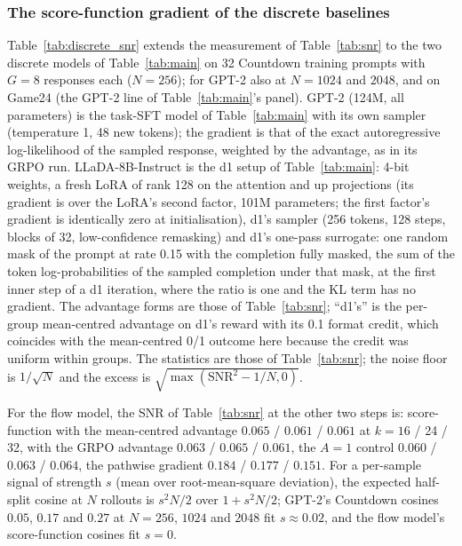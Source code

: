 \fi


\iffalse
\subsubsection{The score-function gradient of the discrete baselines}
\label{app:discrete_snr}
Table~\ref{tab:discrete_snr} extends the measurement of Table~\ref{tab:snr} to the two discrete models of Table~\ref{tab:main} on 32 Countdown training prompts with $G{=}8$ responses each ($N{=}256$); for GPT-2 also at $N{=}1024$ and $2048$, and on Game24 (the GPT-2 line of Table~\ref{tab:main}'s panel). GPT-2 (124M, all parameters) is the task-SFT model of Table~\ref{tab:main} with its own sampler (temperature 1, 48 new tokens); the gradient is that of the exact autoregressive log-likelihood of the sampled response, weighted by the advantage, as in its GRPO run. LLaDA-8B-Instruct is the d1 setup of Table~\ref{tab:main}: 4-bit weights, a fresh LoRA of rank 128 on the attention and up projections (its gradient is over the LoRA's second factor, 101M parameters; the first factor's gradient is identically zero at initialisation), d1's sampler (256 tokens, 128 steps, blocks of 32, low-confidence remasking) and d1's one-pass surrogate: one random mask of the prompt at rate 0.15 with the completion fully masked, the sum of the token log-probabilities of the sampled completion under that mask, at the first inner step of a d1 iteration, where the ratio is one and the KL term has no gradient. The advantage forms are those of Table~\ref{tab:snr}; ``d1's'' is the per-group mean-centred advantage on d1's reward with its 0.1 format credit, which coincides with the mean-centred 0/1 outcome here because the credit was uniform within groups. The statistics are those of Table~\ref{tab:snr}; the noise floor is $1/\sqrt N$ and the excess is $\sqrt{\max(\mathrm{SNR}^2-1/N,0)}$.

For the flow model, the SNR of Table~\ref{tab:snr} at the other two steps is: score-function with the mean-centred advantage $0.065$ / $0.061$ / $0.061$ at $k=16$ / 24 / 32, with the GRPO advantage $0.063$ / $0.065$ / $0.061$, the $A{=}1$ control $0.060$ / $0.063$ / $0.064$, the pathwise gradient $0.184$ / $0.177$ / $0.151$. For a per-sample signal of strength $s$ (mean over root-mean-square deviation), the expected half-split cosine at $N$ rollouts is $s^2N/2$ over $1+s^2N/2$; GPT-2's Countdown cosines $0.05$, $0.17$ and $0.27$ at $N=256$, $1024$ and $2048$ fit $s\approx0.02$, and the flow model's score-function cosines fit $s=0$.

